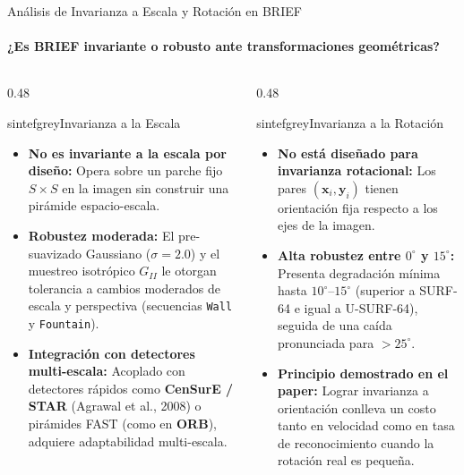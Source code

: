\documentclass{beamer}
\begin{document}
\begin{frame}{Análisis de Invarianza a Escala y Rotación en BRIEF}
\framesubtitle{¿Es BRIEF invariante o robusto ante transformaciones geométricas?}
\begin{columns}[T]
\begin{column}{0.48\textwidth}
\begin{colorblock}[black]{sintefgrey}{Invarianza a la Escala}
\scriptsize
\begin{itemize}\setlength{\itemsep}{3pt}
    \item \textbf{No es invariante a la escala por diseño:} Opera sobre un parche fijo $S \times S$ en la imagen sin construir una pirámide espacio-escala.
    \item \textbf{Robustez moderada:} El pre-suavizado Gaussiano ($\sigma = 2.0$) y el muestreo isotrópico $G_{II}$ le otorgan tolerancia a cambios moderados de escala y perspectiva (secuencias \texttt{Wall} y \texttt{Fountain}).
    \item \textbf{Integración con detectores multi-escala:} Acoplado con detectores rápidos como \textbf{CenSurE / STAR} (Agrawal et al., 2008) o pirámides FAST (como en \textbf{ORB}), adquiere adaptabilidad multi-escala.
\end{itemize}
\end{colorblock}
\end{column}
\begin{column}{0.48\textwidth}
\begin{colorblock}[black]{sintefgrey}{Invarianza a la Rotación}
\scriptsize
\begin{itemize}\setlength{\itemsep}{3pt}
    \item \textbf{No está diseñado para invarianza rotacional:} Los pares $(\mathbf{x}_i, \mathbf{y}_i)$ tienen orientación fija respecto a los ejes de la imagen.
    \item \textbf{Alta robustez entre $0^\circ$ y $15^\circ$:} Presenta degradación mínima hasta $10^\circ\text{--}15^\circ$ (superior a SURF-64 e igual a U-SURF-64), seguida de una caída pronunciada para $>25^\circ$.
    \item \textbf{Principio demostrado en el paper:} Lograr invarianza a orientación conlleva un costo tanto en velocidad como en tasa de reconocimiento cuando la rotación real es pequeña.
\end{itemize}
\end{colorblock}
\end{column}
\end{columns}
\end{frame}
\end{document}

